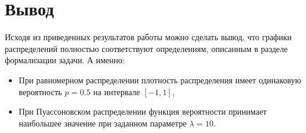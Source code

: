 \documentclass[a4paper,12pt]{article}
\begin{document}
\begin{figure}[h!]
\begin{minipage}[b]{0.5\textwidth}
		\end{minipage}
		\label{ris:examples_3_4}
	\end{figure}
	
	\section*{Вывод}
	
	Исходя из приведенных результатов работы можно сделать вывод, что графики распределений полностью соответствуют определениям, описанным в разделе формализации задачи. А именно:
	
	\begin{itemize}
		\item При равномерном распределении плотность распределения имеет одинаковую вероятность $p = 0.5$ на интервале $[-1, 1]$,
		\item При Пуассоновском распределении функция вероятности принимает наибольшее значение при заданном параметре $\lambda = 10$.
	\end{itemize}
	
\end{document}
